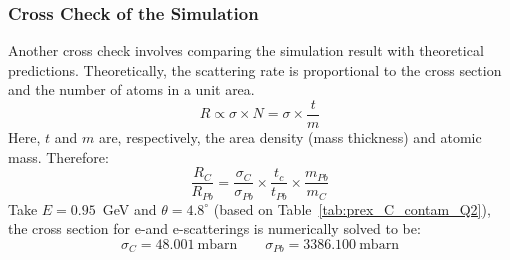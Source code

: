 \subsubsection{Cross Check of the Simulation}
Another cross check involves comparing the simulation result with theoretical predictions. 
Theoretically, the scattering rate is proportional to the cross section and the number of atoms
in a unit area. 
\begin{equation}
    R \propto \sigma \times N = \sigma \times \frac{t}{m}
\end{equation}
Here, $t$ and $m$ are, respectively, the area density (mass thickness) and atomic mass. 
Therefore:
\begin{equation}
    \frac{R_C}{R_{Pb}} = \frac{\sigma_C}{\sigma_{Pb}} \times \frac{t_c}{t_{Pb}} \times \frac{m_{Pb}}{m_C}
\end{equation}
Take $E = 0.95$~GeV and $\theta = 4.8^\circ$ (based on Table~\ref{tab:prex_C_contam_Q2}), 
the cross section for e-\Carbon and e-\Pb scatterings is numerically solved to be:
\begin{equation}
    \sigma_C = 48.001\ \mathrm{mbarn}	\qquad \sigma_{Pb} = 3386.100\ \mathrm{mbarn}	
\end{equation}

